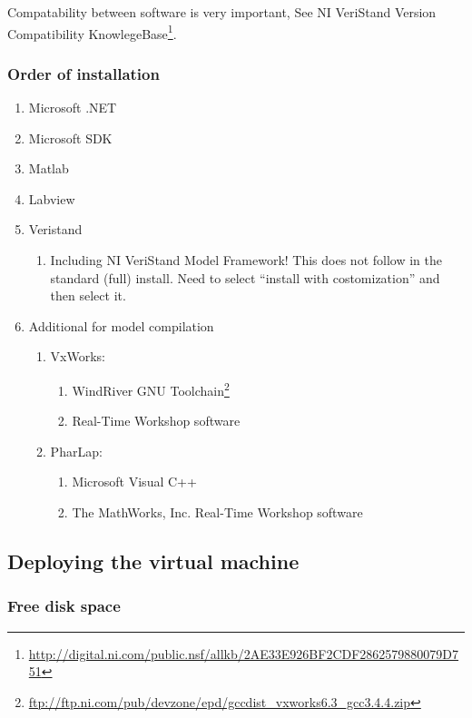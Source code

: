 \documentclass[a4paper,twoside,english]{report}
\begin{document}
Compatability between software is very important, See NI VeriStand
Version Compatibility KnowlegeBase\footnote{\url{http://digital.ni.com/public.nsf/allkb/2AE33E926BF2CDF2862579880079D751}}.

\subsubsection{Order of installation}
\begin{enumerate}
\item Microsoft .NET
\item Microsoft SDK
\item Matlab
\item Labview
\item Veristand

\begin{enumerate}
\item Including NI VeriStand Model Framework! This does not follow in the
standard (full) install. Need to select ``install with costomization''
and then select it.
\end{enumerate}
\item Additional for model compilation

\begin{enumerate}
\item VxWorks:

\begin{enumerate}
\item WindRiver GNU Toolchain\footnote{\url{ftp://ftp.ni.com/pub/devzone/epd/gccdist_vxworks6.3_gcc3.4.4.zip}}
\item Real-Time Workshop software
\end{enumerate}
\item PharLap:

\begin{enumerate}
\item Microsoft Visual C++
\item The MathWorks, Inc. Real-Time Workshop\textregistered{} software
\end{enumerate}
\end{enumerate}
\end{enumerate}
\clearpage{}

\subsection{\label{subsec: virtualmachine}Deploying the virtual machine}

\subsubsection{Free disk space}
\end{document}
